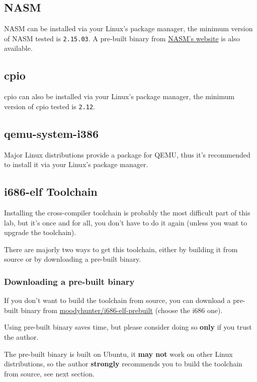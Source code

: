 \subsection{NASM} \label{sec:nasm-install}

NASM can be installed via your Linux's package manager, the minimum version of NASM tested is
\texttt{2.15.03}. A pre-built binary from \href{https://www.nasm.us}{NASM's website} is also
available.

\subsection{cpio} \label{sec:cpio-install}

cpio can also be installed via your Linux's package manager, the minimum version of cpio
tested is \texttt{2.12}.

\subsection{qemu-system-i386} \label{sec:qemu-install}

Major Linux distributions provide a package for QEMU, thus it's recommended to install it via
your Linux's package manager.

\subsection{i686-elf Toolchain} \label{sec:cross-compiler-install}

Installing the cross-compiler toolchain is probably the most difficult part of this lab,
but it's once and for all, you don't have to do it again (unless you want to upgrade the
toolchain).

There are majorly two ways to get this toolchain, either by building it from source or by
downloading a pre-built binary.

\subsubsection{Downloading a pre-built binary}

If you don't want to build the toolchain from source, you can download a pre-built
binary from
\href{https://github.com/moodyhunter/i686-elf-prebuilt/releases}{moodyhunter/i686-elf-prebuilt}
(choose the i686 one).

\begin{warning}
    \item Using pre-built binary saves time, but please consider doing so \textbf{only} if you
    trust the author.
    \item The pre-built binary is built on Ubuntu, it \textbf{may not} work on other Linux
    distributions, so the author \textbf{strongly} recommends you to build the toolchain from
    source, see next section.
\end{warning}

